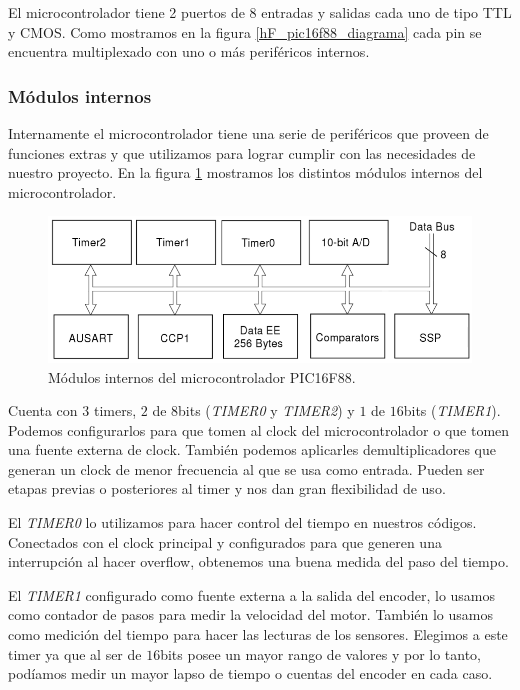 El microcontrolador tiene 2 puertos de 8 entradas y salidas cada uno de tipo TTL y CMOS.
Como mostramos en la figura \ref{hF_pic16f88_diagrama} cada pin se encuentra multiplexado con uno o m\'as perif\'ericos internos.

\subsubsection{M\'odulos internos}
\label{h_controlador_micro_modulos}

Internamente el microcontrolador tiene una serie de perif\'ericos que proveen de funciones extras y que utilizamos para lograr
cumplir con las necesidades de nuestro proyecto.
En la figura \ref{hF_pic16f88_modulos} mostramos los distintos m\'odulos internos del microcontrolador.

\begin{figure}[b]
	\centering
	\includegraphics[scale=0.35]{pic16f88_modulos.png}
	\caption{M\'odulos internos del microcontrolador PIC16F88.}
	\label{hF_pic16f88_modulos}
\end{figure}

Cuenta con $3$ timers, $2$ de $8$bits (\emph{TIMER0} y \emph{TIMER2}) y $1$ de $16$bits (\emph{TIMER1}).
Podemos configurarlos para que tomen al clock del microcontrolador o que tomen una fuente externa de clock.
Tambi\'en podemos aplicarles demultiplicadores que generan un clock de menor frecuencia al que se usa como entrada.
Pueden ser etapas previas o posteriores al timer y nos dan gran flexibilidad de uso.

El \emph{TIMER0} lo utilizamos para hacer control del tiempo en nuestros c\'odigos.
Conectados con el clock principal y configurados para que generen una interrupci\'on al hacer overflow,
obtenemos una buena medida del paso del tiempo.

El \emph{TIMER1} configurado como fuente externa a la salida del encoder, lo usamos como contador de pasos para medir la
velocidad del motor.
Tambi\'en lo usamos como medici\'on del tiempo para hacer las lecturas de los sensores.
Elegimos a este timer ya que al ser de $16$bits posee un mayor rango de valores y por lo tanto, pod\'iamos medir un mayor lapso
de tiempo o cuentas del encoder en cada caso.

